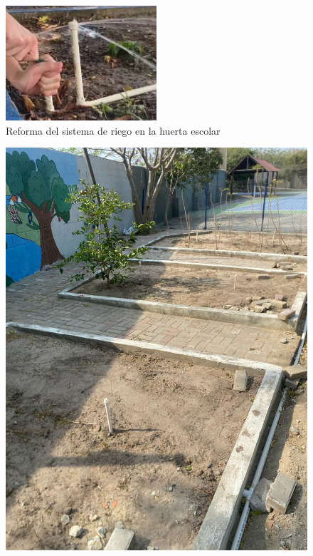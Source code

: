 \documentclass[12pt]{article}
\begin{document}
\begin{figure}[h!]
      \centering
      \includegraphics[width=0.5\textwidth]{imagenes/sprinkler.jpg}
      \caption{Reforma del sistema de riego en la huerta escolar}
      \label{fig:sprinkler}
\end{figure}

\begin{figure}[h!]
      \centering
      \begin{minipage}[b]{0.48\textwidth}
            \includegraphics[width=\textwidth]{imagenes/sprinkler2.jpg}

\end{minipage}
\end{figure}
\end{document}
